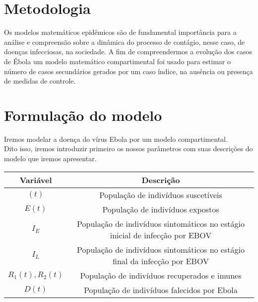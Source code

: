 \documentclass[12pt,a4paper]{article}
\begin{document}
\section*{Metodologia}
Os modelos matemáticos epidêmicos são de fundamental importância para a análise e compreensão sobre a dinâmica do processo de contágio, nesse caso, de doenças infecciosas, na sociedade. A fim de compreendermos a evolução dos casos de Ébola um modelo matemático compartimental foi usado para estimar o número de casos secundários gerados por um caso índice, na ausência ou presença de medidas de controle.

\section*{Formulação do modelo}
Iremos modelar a doença do vírus Ebola por um modelo compartimental. \\
Dito isso, iremos introduzir primeiro os nossos parâmetros com suas descrições do modelo que iremos apresentar. \\
\begin{center}
\begin{tabular}{||c c||} 
 \hline
 Variável & Descrição\\ [0.5ex] 
 \hline\hline
 $(t)$ & População de indivíduos suscetíveis  \\ 
 \hline
 $E(t)$ & População de indivíduos expostos  \\
 \hline
 $I_E$ & População de indivíduos sintomáticos no estágio inicial de infecção por EBOV \\
 \hline
 $I_L$ & População de indivíduos sintomáticos no estágio final da infecção por EBOV \\
 \hline
 $R_1(t),R_2(t)$ & População de indivíduos recuperados e imunes \\
 \hline
 $D(t)$ & População de indivíduos falecidos por Ebola \\[1ex]
 \hline
\end{tabular}
\end{center}
\end{document}
